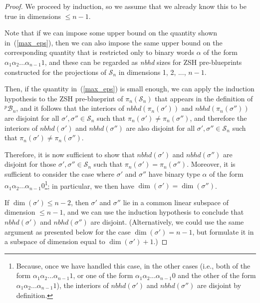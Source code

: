 \documentclass[12pt,letterpaper]{article}
\renewcommand{\S}{\mathcal{S}}
\newcommand{\B}{\mathcal{B}}
\newcommand{\eps}{\varepsilon}
\newcommand{\nbhd}{\mathit{nbhd}}
\renewcommand{\a}{\alpha}
\begin{document}
\begin{proof}
We proceed by induction, so we assume that we already know this to be true in dimensions $\le n-1$.


Note that if we can impose some upper bound on the quantity shown in~(\ref{max_eps}), then we can also impose the same upper bound on the corresponding quantity that is restricted only to binary words $\a$ of the form $\a_1\a_2...\a_{n-1}1$, and these can be regarded as {\em nbhd} sizes for ZSH pre-blueprints constructed for the projections of $\S_n$ in dimensions 1, 2, ..., $n-1$. 


\noindent
Then, if the quantity in~(\ref{max_eps}) is small enough, we can apply the induction hypothesis to the ZSH pre-blueprint 
of $\pi_n(\S_n)$ that appears in the definition of $^p\!\B_n$, and it follows that the interiors of $\nbhd(\pi_n(\sigma'))$ and $\nbhd(\pi_n(\sigma''))$ are disjoint for all $\sigma', \sigma'' \in \S_n$ such that $\pi_n(\sigma') \neq \pi_n(\sigma'')$, and therefore the interiors of $\nbhd(\sigma')$ and $\nbhd(\sigma'')$ are also disjoint for all $\sigma', \sigma'' \in \S_n$ such that $\pi_n(\sigma') \neq \pi_n(\sigma'')$.



Therefore, it is now sufficient to show that $\nbhd(\sigma')$ and $\nbhd(\sigma'')$ are disjoint for those $\sigma', \sigma'' \in \S_n$ such that $\pi_n(\sigma') = \pi_n(\sigma'')$. Moreover, it is sufficient to consider the case where $\sigma'$ and $\sigma''$ have binary type $\a$ of the form $\a_1\a_2...\a_{n-1}0$\footnote{Because, once we have handled this case, in the other cases (i.e., both of the form $\a_1\a_2...\a_{n-1}1$, or one of the form $\a_1\a_2...\a_{n-1}0$ and the other of the form $\a_1\a_2...\a_{n-1}1$), the interiors of $\nbhd(\sigma')$ and $\nbhd(\sigma'')$ are disjoint by definition.}; in particular, we then have $\dim(\sigma') = \dim(\sigma'')$.

If $\dim(\sigma') \le n-2$, then  $\sigma'$ and $\sigma''$ lie in a common linear subspace of dimension $\le n-1$, and we can use the induction hypothesis to conclude that $\nbhd(\sigma')$ and $\nbhd(\sigma'')$ are disjoint. (Alternatively, we could use the same argument as presented below for the case $\dim(\sigma') = n-1$, but formulate it in a subspace of dimension equal to $\dim(\sigma')+1$.)


\end{proof}
\end{document}
